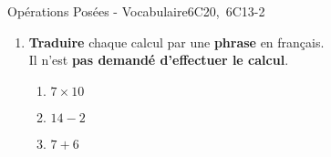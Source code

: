\begin{EXOEVAL}{Opérations Posées - Vocabulaire}{6C20,\ 6C13-2}
\begin{multicols}{2}
\begin{enumerate}[itemsep=1em,start=3]
		\columnbreak

		\item \textbf{Traduire} chaque calcul par une \textbf{phrase} en français.\\
			Il n'est \textbf{pas demandé d'effectuer le calcul}.

		\begin{enumerate}[itemsep=1em]
			\item $7 \times 10$\tcfillcrep{}\phantom{AAAAA} \\ 
			\item $14 - 2$\tcfillcrep{}\phantom{AAAAA}\\ 
			\item $7+6$\tcfillcrep{}\phantom{AAAAA}\\ 
		\end{enumerate}
	\end{enumerate}
\end{multicols}

\end{EXOEVAL}

\newpage


